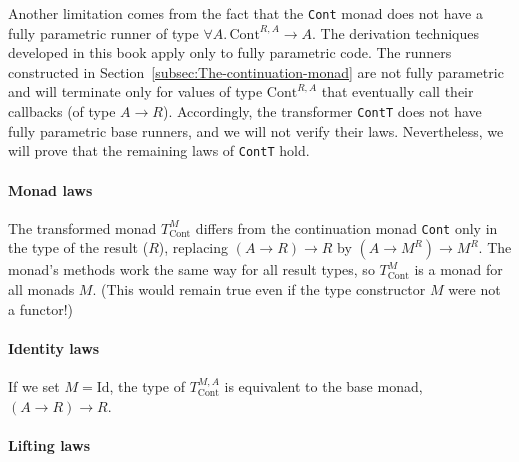 Another limitation comes from the fact that the \lstinline!Cont!
monad does not have a fully parametric runner of type $\forall A.\,\text{Cont}^{R,A}\rightarrow A$.
The derivation techniques developed in this book apply only to fully
parametric code. The runners constructed in Section~\ref{subsec:The-continuation-monad}
are not fully parametric and will terminate only for values of type
$\text{Cont}^{R,A}$ that eventually call their callbacks (of type
$A\rightarrow R$). Accordingly, the transformer \lstinline!ContT!
does not have fully parametric base runners, and we will not verify
their laws. Nevertheless, we will prove that the remaining laws of
\lstinline!ContT! hold.

\paragraph{Monad laws}

The transformed monad $T_{\text{Cont}}^{M}$ differs from the continuation
monad \lstinline!Cont! only in the type of the result ($R$), replacing
$\left(A\rightarrow R\right)\rightarrow R$ by $(A\rightarrow M^{R})\rightarrow M^{R}$.
The monad\textsf{'}s methods work the same way for all result types, so $T_{\text{Cont}}^{M}$
is a monad for all monads $M$. (This would remain true even if the
type constructor $M$ were not a functor!)

\paragraph{Identity laws}

If we set $M=\text{Id}$, the type of $T_{\text{Cont}}^{M,A}$ is
equivalent to the base monad, $\left(A\rightarrow R\right)\rightarrow R$.

\paragraph{Lifting laws}

